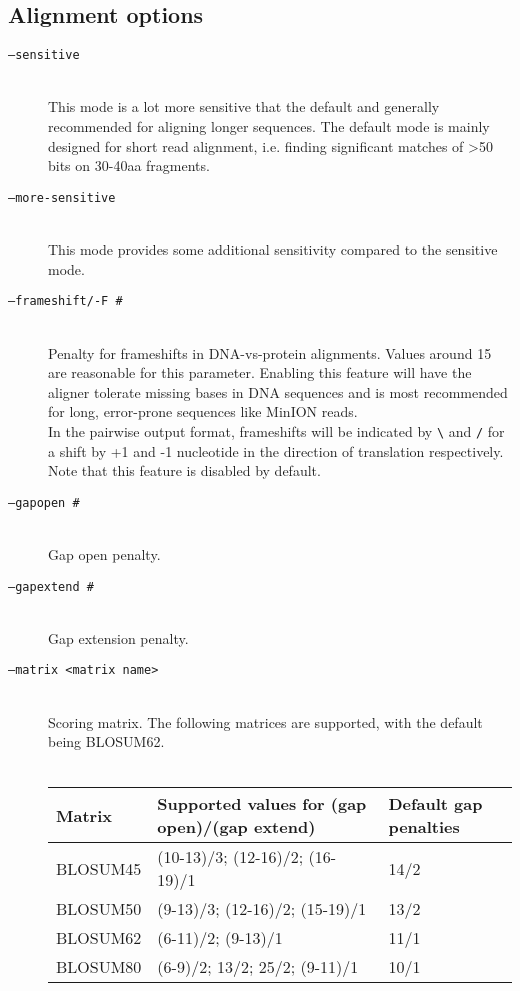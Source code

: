 \documentclass[11pt]{article}
\begin{document}
\subsection{Alignment options}
\begin{description}
\item[\texttt{--sensitive}]\hfill\\
This mode is a lot more sensitive that the default and generally recommended for aligning longer sequences. The default mode is mainly designed for short read alignment, i.e. finding significant matches of \textgreater 50 bits on 30-40aa fragments.
\item[\texttt{--more-sensitive}]\hfill\\
This mode provides some additional sensitivity compared to the sensitive mode.
\item[\texttt{--frameshift/-F \#}]\hfill\\
Penalty for frameshifts in DNA-vs-protein alignments. Values around 15 are reasonable for this parameter. Enabling this feature will have the aligner tolerate missing bases in DNA sequences and is most recommended for long, error-prone sequences like MinION reads.\\
In the pairwise output format, frameshifts will be indicated by \texttt{\textbackslash} and \texttt{/} for a shift by +1 and -1 nucleotide in the direction of translation respectively.\\
Note that this feature is disabled by default.
\item[\texttt{--gapopen \#}]\hfill\\
Gap open penalty.
\item[\texttt{--gapextend \#}]\hfill\\
Gap extension penalty.
\item[\texttt{--matrix <matrix name>}]\hfill\\
Scoring matrix. The following matrices are supported, with the default being BLOSUM62.\\\\
\begin{tabular}{l l l}
\hline
Matrix & Supported values for (gap open)/(gap extend) & Default gap penalties\\
\hline
BLOSUM45 & (10-13)/3; (12-16)/2; (16-19)/1 & 14/2\\
BLOSUM50 & (9-13)/3; (12-16)/2; (15-19)/1 & 13/2\\
BLOSUM62 & (6-11)/2; (9-13)/1 & 11/1\\
BLOSUM80 & (6-9)/2; 13/2; 25/2; (9-11)/1 & 10/1\\

\end{tabular}
\end{description}
\end{document}
